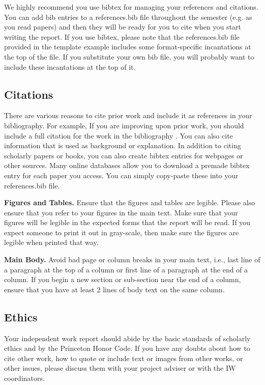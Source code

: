 \documentclass[pageno]{jpaper}
\begin{document}
We highly recommend you use bibtex for managing your references and citations.  You can add bib entries to a references.bib file throughout the semester (e.g. as you read papers) and then they will be ready for you to cite when you start writing the report.  If you use bibtex, please note that the references.bib file provided in the template example includes some format-specific incantations at the top of the file.  If you substitute your own bib file, you will probably want to include these
incantations at the top of it.

\subsection{Citations}

There are various reasons to cite prior work and include it as references in your bibliography.  For example, If you are improving upon
prior work, you should include
a full citation for the work in the bibliography \cite{nicepaper,nicepaper2}.
You can also cite information that is used as background or explanation.  In addition to citing scholarly papers or books, you can also create bibtex entries for webpages or other sources.  Many online databases allow you to download a premade bibtex entry for each paper you access.  You can simply copy-paste these into your references.bib file.

\noindent\textbf{Figures and Tables.} Ensure that the figures and
tables are legible.  Please also ensure that you refer to your
figures in the main text. Make sure that your figures will be legible
in the expected forms that the report will be read.  If you expect someone
to print it out in gray-scale, then make sure the figures are legible
when printed that way.

\noindent\textbf{Main Body.} Avoid bad page or column breaks in
your main text, i.e., last line of a paragraph at the top of a
column or first line of a paragraph at the end of a column. If you
begin a new section or sub-section near the end of a column,
ensure that you have at least 2 lines of body text on the same
column.

\subsection{Ethics}

Your independent work report should abide by the basic standards of scholarly ethics and by the Princeton Honor Code. If you have any doubts about how to cite
other work, how to quote or include text or images from other works, or other issues, please discuss them with your project adviser or with the IW coordinators.
\end{document}
